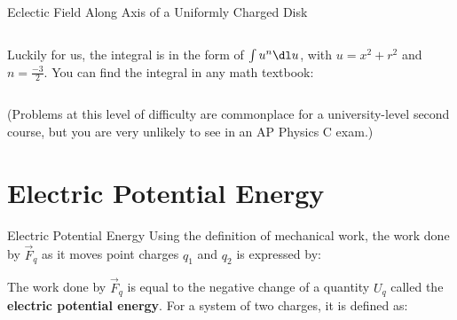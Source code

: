 \documentclass[12pt,aspectratio=169]{beamer}
\begin{document}
\begin{frame}{Eclectic Field Along Axis of a Uniformly Charged Disk}
  \begin{columns}
    
    Luckily for us, the integral is in the form of $\int u^n\dl u$,
    with $u=x^2+r^2$ and $n=\frac{-3}2$. You can find the integral in any math
    textbook:

  \end{columns}
  (Problems at this level of difficulty are commonplace for a university-level
  second course, but you are very unlikely to see in an AP Physics C exam.)
\end{frame}



\section{Electric Potential Energy}

\begin{frame}{Electric Potential Energy}
  Using the definition of mechanical work, the work done by $\vec F_q$ as it
  moves point charges $q_1$ and $q_2$ is expressed by:
  

  The work done by $\vec F_q$ is equal to the negative change of a quantity
  $U_q$ called the \textbf{electric potential energy}. For a system of two
  charges, it is defined as:
    
\end{frame}
\end{document}
